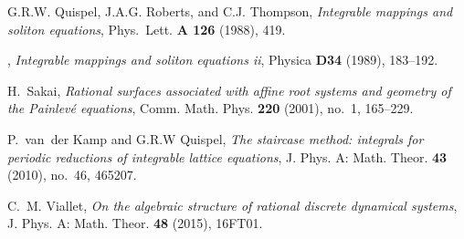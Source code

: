 \documentclass[reqno]{amsart}
\numberwithin{equation}{section}
\numberwithin{figure}{section}
\begin{document}
\begin{thebibliography}{10}
G.R.W. Quispel, J.A.G. Roberts, and C.J. Thompson, \emph{Integrable mappings
  and soliton equations}, Phys.\ Lett. \textbf{A 126} (1988), 419.

\bysame, \emph{Integrable mappings and soliton equations ii}, Physica
  \textbf{D34} (1989), 183--192.

H.~Sakai, \emph{Rational surfaces associated with affine root systems and
  geometry of the {P}ainlev\'e equations}, Comm. Math. Phys. \textbf{220}
  (2001), no.~1, 165--229.

P.~van~der Kamp and G.R.W Quispel, \emph{The staircase method: integrals for
  periodic reductions of integrable lattice equations}, J. Phys. A: Math.
  Theor. \textbf{43} (2010), no.~46, 465207.

C.~M. Viallet, \emph{On the algebraic structure of rational discrete dynamical
  systems}, J. Phys. A: Math. Theor. \textbf{48} (2015), 16FT01.

\end{thebibliography}
\end{document}
